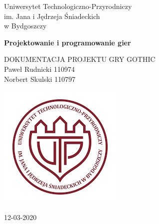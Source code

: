 \documentclass[11pt,polish, openany]{book}
\begin{document}

\begin{titlepage}
	\clearpage\thispagestyle{empty}
	\centering
	\vspace{1cm}

	{\normalsize Uniwersytet Technologiczno-Przyrodniczy \\ 
		im. Jana i Jędrzeja Śniadeckich \\
		w Bydgoszczy \par}
		\vspace{3cm}
	{\Huge \textbf{Projektowanie i programowanie gier}} \\
	\vspace{4cm}
	{\normalsize DOKUMENTACJA PROJEKTU GRY GOTHIC \\ %
	             Paweł Rudnicki 110974 \\
	             Norbert Skulski 110797\par}
	\vspace{5cm}
    
    \centering \includegraphics[scale=0.5]{utp.png}
    
    \vspace{0.5cm}
		
	{\normalsize 12-03-2020 \par}
	
	\pagebreak

\end{titlepage}

\tableofcontents{}

\mainmatter
\end{document}
